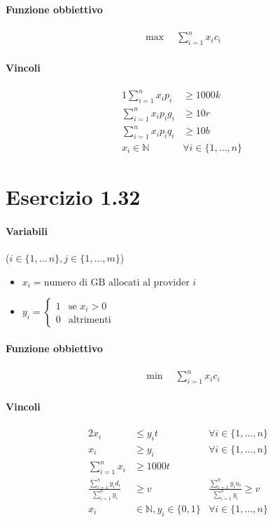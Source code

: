 \documentclass{article}
\begin{document}
\paragraph{Funzione obbiettivo}
\begin{align*}
  \max \quad \sum_{i=1}^n x_i c_i
\end{align*}

\paragraph{Vincoli}
\begin{alignat}{1}
  \sum_{i=1}^n x_i p_i &\geq 1000k \\
  \sum_{i=1}^n x_i p_i g_i &\geq 10r \\
  \sum_{i=1}^n x_i p_i q_i &\geq 10b \\
  x_i \in \mathbb{N} \quad &\forall i \in \{1,\ldots,n\}
\end{alignat}

\pagebreak
\section{Esercizio 1.32}

\paragraph{Variabili} ($i \in \{1,\ldots\,n\}, j \in \{1,\ldots,m\}$)
\begin{itemize}
  \item $x_i = \text{numero di GB allocati al provider }i$
  \item $y_i = \begin{cases}
      1 & \text{se }x_i > 0 \\
      0 & \text{altrimenti}
  \end{cases}$
\end{itemize}

\paragraph{Funzione obbiettivo}
\begin{align*}
  \min \quad \sum_{i=1}^n x_i c_i
\end{align*}

\paragraph{Vincoli}
\begin{alignat}{2}
  x_i &\leq y_i t &\forall i \in \{1,\ldots,n\} \\
  x_i &\geq y_i &\forall i \in \{1,\ldots,n\} \\
  \sum_{i=1}^n x_i &\geq 1000t & \\
  \frac{\sum_{i=1}^n y_i d_i}{\sum_{i=1}^n y_i} &\geq v \quad 
  &\frac{\sum_{i=1}^n y_i u_i}{\sum_{i=1}^n y_i} \geq v &\\
  x_i &\in \mathbb{N}, y_i \in \{0, 1\} &\forall i \in \{1,\ldots,n\}
\end{alignat}
\end{document}
